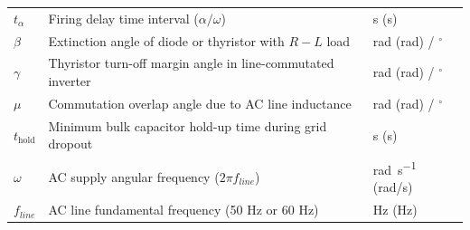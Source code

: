 \begin{center}
\begin{tabular}{@{}lll@{}}
$t_\alpha$ & Firing delay time interval ($\alpha/\omega$) & \si{\second} (s) \\
$\beta$ & Extinction angle of diode or thyristor with $R-L$ load & \si{\radian} (rad) / $^\circ$ \\
$\gamma$ & Thyristor turn-off margin angle in line-commutated inverter & \si{\radian} (rad) / $^\circ$ \\
$\mu$ & Commutation overlap angle due to AC line inductance & \si{\radian} (rad) / $^\circ$ \\
$t_{\mathrm{hold}}$ & Minimum bulk capacitor hold-up time during grid dropout & \si{\second} (s) \\
$\omega$ & AC supply angular frequency ($2\pi f_{line}$) & \si{\radian\per\second} (rad/s) \\
$f_{line}$ & AC line fundamental frequency (50 Hz or 60 Hz) & \si{\hertz} (Hz) \\
\bottomrule
\end{tabular}
\end{center}

